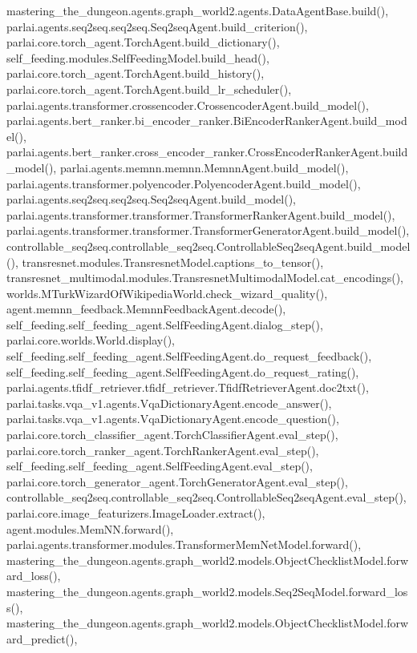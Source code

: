 mastering\+\_\+the\+\_\+dungeon.\+agents.\+graph\+\_\+world2.\+agents.\+Data\+Agent\+Base.\+build(), parlai.\+agents.\+seq2seq.\+seq2seq.\+Seq2seq\+Agent.\+build\+\_\+criterion(), parlai.\+core.\+torch\+\_\+agent.\+Torch\+Agent.\+build\+\_\+dictionary(), self\+\_\+feeding.\+modules.\+Self\+Feeding\+Model.\+build\+\_\+head(), parlai.\+core.\+torch\+\_\+agent.\+Torch\+Agent.\+build\+\_\+history(), parlai.\+core.\+torch\+\_\+agent.\+Torch\+Agent.\+build\+\_\+lr\+\_\+scheduler(), parlai.\+agents.\+transformer.\+crossencoder.\+Crossencoder\+Agent.\+build\+\_\+model(), parlai.\+agents.\+bert\+\_\+ranker.\+bi\+\_\+encoder\+\_\+ranker.\+Bi\+Encoder\+Ranker\+Agent.\+build\+\_\+model(), parlai.\+agents.\+bert\+\_\+ranker.\+cross\+\_\+encoder\+\_\+ranker.\+Cross\+Encoder\+Ranker\+Agent.\+build\+\_\+model(), parlai.\+agents.\+memnn.\+memnn.\+Memnn\+Agent.\+build\+\_\+model(), parlai.\+agents.\+transformer.\+polyencoder.\+Polyencoder\+Agent.\+build\+\_\+model(), parlai.\+agents.\+seq2seq.\+seq2seq.\+Seq2seq\+Agent.\+build\+\_\+model(), parlai.\+agents.\+transformer.\+transformer.\+Transformer\+Ranker\+Agent.\+build\+\_\+model(), parlai.\+agents.\+transformer.\+transformer.\+Transformer\+Generator\+Agent.\+build\+\_\+model(), controllable\+\_\+seq2seq.\+controllable\+\_\+seq2seq.\+Controllable\+Seq2seq\+Agent.\+build\+\_\+model(), transresnet.\+modules.\+Transresnet\+Model.\+captions\+\_\+to\+\_\+tensor(), transresnet\+\_\+multimodal.\+modules.\+Transresnet\+Multimodal\+Model.\+cat\+\_\+encodings(), worlds.\+M\+Turk\+Wizard\+Of\+Wikipedia\+World.\+check\+\_\+wizard\+\_\+quality(), agent.\+memnn\+\_\+feedback.\+Memnn\+Feedback\+Agent.\+decode(), self\+\_\+feeding.\+self\+\_\+feeding\+\_\+agent.\+Self\+Feeding\+Agent.\+dialog\+\_\+step(), parlai.\+core.\+worlds.\+World.\+display(), self\+\_\+feeding.\+self\+\_\+feeding\+\_\+agent.\+Self\+Feeding\+Agent.\+do\+\_\+request\+\_\+feedback(), self\+\_\+feeding.\+self\+\_\+feeding\+\_\+agent.\+Self\+Feeding\+Agent.\+do\+\_\+request\+\_\+rating(), parlai.\+agents.\+tfidf\+\_\+retriever.\+tfidf\+\_\+retriever.\+Tfidf\+Retriever\+Agent.\+doc2txt(), parlai.\+tasks.\+vqa\+\_\+v1.\+agents.\+Vqa\+Dictionary\+Agent.\+encode\+\_\+answer(), parlai.\+tasks.\+vqa\+\_\+v1.\+agents.\+Vqa\+Dictionary\+Agent.\+encode\+\_\+question(), parlai.\+core.\+torch\+\_\+classifier\+\_\+agent.\+Torch\+Classifier\+Agent.\+eval\+\_\+step(), parlai.\+core.\+torch\+\_\+ranker\+\_\+agent.\+Torch\+Ranker\+Agent.\+eval\+\_\+step(), self\+\_\+feeding.\+self\+\_\+feeding\+\_\+agent.\+Self\+Feeding\+Agent.\+eval\+\_\+step(), parlai.\+core.\+torch\+\_\+generator\+\_\+agent.\+Torch\+Generator\+Agent.\+eval\+\_\+step(), controllable\+\_\+seq2seq.\+controllable\+\_\+seq2seq.\+Controllable\+Seq2seq\+Agent.\+eval\+\_\+step(), parlai.\+core.\+image\+\_\+featurizers.\+Image\+Loader.\+extract(), agent.\+modules.\+Mem\+N\+N.\+forward(), parlai.\+agents.\+transformer.\+modules.\+Transformer\+Mem\+Net\+Model.\+forward(), mastering\+\_\+the\+\_\+dungeon.\+agents.\+graph\+\_\+world2.\+models.\+Object\+Checklist\+Model.\+forward\+\_\+loss(), mastering\+\_\+the\+\_\+dungeon.\+agents.\+graph\+\_\+world2.\+models.\+Seq2\+Seq\+Model.\+forward\+\_\+loss(), mastering\+\_\+the\+\_\+dungeon.\+agents.\+graph\+\_\+world2.\+models.\+Object\+Checklist\+Model.\+forward\+\_\+predict(), 